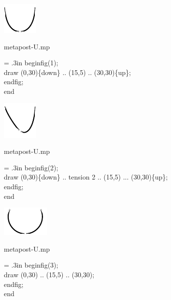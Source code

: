 \documentclass[danish,a2paper,11pt]{scrartcl}
\begin{document}
\begin{multicols*}{3}
\center
\includegraphics[scale=5]{metapoints/metapoints-6.pdf}
\vspace{2cm}

\flushleft
\color{White}
\romansmall
metapost-U.mp\\
\vspace{.4cm}
\color{Black}
\typewritersmall
{\leftskip = .3in
beginfig(1);\\
draw (0,30)\{down\} .. (15,5) .. (30,30)\{up\};\\
endfig;\\
end
\par}
\vspace{2cm}

\center
\includegraphics[scale=5]{metapoints/metapoints-7.pdf}
\vspace{2cm}

\flushleft
\color{White}
\romansmall
metapost-U.mp\\
\vspace{.4cm}
\color{Black}
\typewritersmall
{\leftskip = .3in
beginfig(2);\\
draw (0,30)\{down\} .. tension 2 .. (15,5) ... (30,30)\{up\};\\
endfig;\\
end
\par}
\vspace{2cm}

\center
\includegraphics[scale=5]{metapoints/metapoints-8.pdf}
\vspace{2cm}

\flushleft
\color{White}
\romansmall
metapost-U.mp\\
\vspace{.4cm}
\color{Black}
\typewritersmall
{\leftskip = .3in
beginfig(3);\\
draw (0,30) .. (15,5) .. (30,30);\\
endfig;\\
end
\par}
\vspace{2cm}


\end{multicols*}
\end{document}
